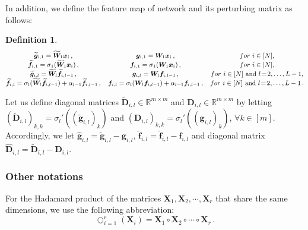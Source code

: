 \documentclass[nohyperref]{article}
\theoremstyle{plain}
\theoremstyle{definition}
\newtheorem{definition}{Definition}
\theoremstyle{remark}
\begin{document}
In addition, we define the feature map of network and its perturbing matrix as follows:
\begin{definition}
\label{def:problem_setting_feature_map_and_perturbation}
\begin{equation*}
\small
\begin{matrix}
\widetilde{\bm{g}}_{i,1} = \widetilde{\bm{W}}_1 \bm{x}_i \,, & \bm{g}_{i,1} = \bm{W}_1\bm{x}_i \,, & for\ i \in [N],\\
\widetilde{\bm{f}}_{i,1} = \sigma_1  (\widetilde{\bm{W}}_1\bm{x}_i) \,, & \bm{f}_{i,1} = \sigma_1 (\bm{W}_1\bm{x}_i) \,,& for\ i \in [N],\\
\widetilde{\bm{g}}_{i,l} = \widetilde{\bm{W}}_{l}\widetilde{\bm{f}}_{i,l-1} \,,   & \bm{g}_{i,l} = \bm{W}_{l}\bm{f}_{i,l-1} \,, & for\ i \in [N] \ \text{and}\  l \!=\! 2,\dots, L-1,\\
\widetilde{\bm{f}}_{i,l} = \sigma_l (\widetilde{\bm{W}}_{l}\widetilde{\bm{f}}_{i,l-1})+\alpha_{l-1}\widetilde{\bm{f}}_{i,l-1} \,,  & \bm{f}_{i,l} = \sigma_l (\bm{W}_{l}\bm{f}_{i,l-1})+\alpha_{l-1}\bm{f}_{i,l-1} \,, & for\ i \in [N] \ \text{and}\  l \!=\! 2,\dots, L-1\,.
\end{matrix}
\end{equation*}

Let us define diagonal matrices $\widetilde{\bm{D}}_{i,l} \in \mathbb{R}^{m\times m} $ and $\bm{D}_{i,l} \in \mathbb{R}^{m\times m} $ by letting $(\widetilde{\bm{D}}_{i,l})_{k,k} = {\sigma_l}'((\widetilde{\bm{g}}_{i,l})_k) $ and $(\bm{D}_{i,l})_{k,k} = {\sigma_l}'((\bm{g}_{i,l})_k) $, $\forall k \in [m]$. Accordingly, we let $\hat{\bm{g}}_{i,l} = \widetilde{\bm{g}}_{i,l} - \bm{g}_{i,l}$, $\hat{\bm{f}}_{i,l} = \widetilde{\bm{f}}_{i,l} - \bm{f}_{i,l}$ and diagonal matrix $\hat{\bm{D}}_{i,l} = \widetilde{\bm{D}}_{i,l} - \bm{D}_{i,l}$.

\end{definition}




\subsubsection{Other notations}
\label{sssec:other_notations}

For the Hadamard product of the matrices $\bm{X}_1, \bm{X}_2, \cdots, \bm{X}_r$ that share the same dimensions, we use the following abbreviation:
\begin{equation*}
\bigcirc_{i=1}^{r}(\bm{X}_i) = \bm{X}_1 \circ \bm{X}_2 \circ \cdots \circ \bm{X}_r\,.
\end{equation*}
\end{document}
